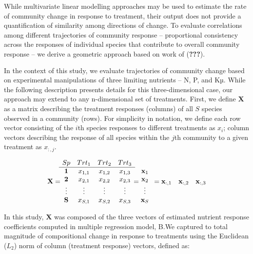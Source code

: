\documentclass[twoside,12pt,final]{ucthesis-CA2012}
\begin{document}
\begin{ucmainmatter}
\begin{figure}
\end{figure}
While multivariate linear modelling approaches may be used to estimate the rate of community change in response to treatment, their output does not provide a quantification of similarity among directions of change. To evaluate correlations among different trajectories of community response -- proportional consistency across the responses of individual species that contribute to overall community response -- we derive a geometric approach based on work of ({\textbf{???}}).

In the context of this study, we evaluate trajectories of community change based on experimental manipulations of three limiting nutrients -- N, P, and Kµ. While the following description presents details for this three-dimensional case, our approach may extend to any n-dimensional set of treatments. First, we define \(\mathbf{X}\) as a matrix describing the treatment responses (columns) of all \(S\) species observed in a community (rows). For simplicity in notation, we define each row vector consisting of the \(i\)th species responses to different treatments as \(x_i\); column vectors describing the response of all species within the \(j\)th community to a given treatment as \(x_{:,j}\).

\[
\mathbf{X} = 
\begin{matrix}
Sp & Trt_1 & Trt_2 & Trt_3\\
\hline
\mathbf{1}& x_{1,1} & x_{1,2} & x_{1,3} \\
\mathbf{2} & x_{2,1} & x_{2,2} & x_{2,3} \\
\vdots & \vdots & \vdots & \vdots \\
\mathbf{S} & x_{S,1} & x_{S,2} & x_{S,3} \\
\end{matrix} =
\begin{matrix}
\\
\mathbf{x}_1 \\
\mathbf{x}_2 \\
\vdots \\
\mathbf{x}_S \\
\end{matrix} \\
= \\
\begin{matrix}
\mathbf{x}_{:,1} & \mathbf{x}_{:,2} & \mathbf{x}_{:,3}\\
\end{matrix}
\]

In this study, \(\mathbf{X}\) was composed of the three vectors of estimated nutrient response coefficients computed in multiple regression model, B.We captured to total magnitude of compositional change in response to treatments using the Euclidean (\(L_2\)) norm of column (treatment response) vectors, defined as:


\end{ucmainmatter}
\end{document}
